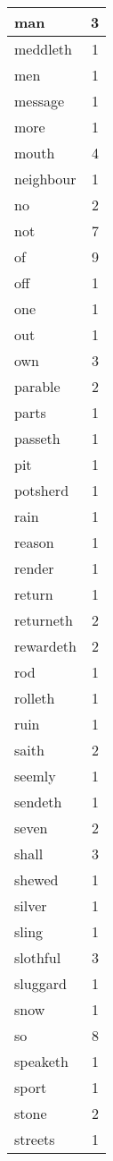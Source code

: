 \begin{center}
\begin{longtable}{l|r}
man & 3\\ \hline 
meddleth & 1\\ \hline 
men & 1\\ \hline 
message & 1\\ \hline 
more & 1\\ \hline 
mouth & 4\\ \hline 
neighbour & 1\\ \hline 
no & 2\\ \hline 
not & 7\\ \hline 
of & 9\\ \hline 
off & 1\\ \hline 
one & 1\\ \hline 
out & 1\\ \hline 
own & 3\\ \hline 
parable & 2\\ \hline 
parts & 1\\ \hline 
passeth & 1\\ \hline 
pit & 1\\ \hline 
potsherd & 1\\ \hline 
rain & 1\\ \hline 
reason & 1\\ \hline 
render & 1\\ \hline 
return & 1\\ \hline 
returneth & 2\\ \hline 
rewardeth & 2\\ \hline 
rod & 1\\ \hline 
rolleth & 1\\ \hline 
ruin & 1\\ \hline 
saith & 2\\ \hline 
seemly & 1\\ \hline 
sendeth & 1\\ \hline 
seven & 2\\ \hline 
shall & 3\\ \hline 
shewed & 1\\ \hline 
silver & 1\\ \hline 
sling & 1\\ \hline 
slothful & 3\\ \hline 
sluggard & 1\\ \hline 
snow & 1\\ \hline 
so & 8\\ \hline 
speaketh & 1\\ \hline 
sport & 1\\ \hline 
stone & 2\\ \hline 
streets & 1\\ \hline 

\end{longtable}
\end{center}
